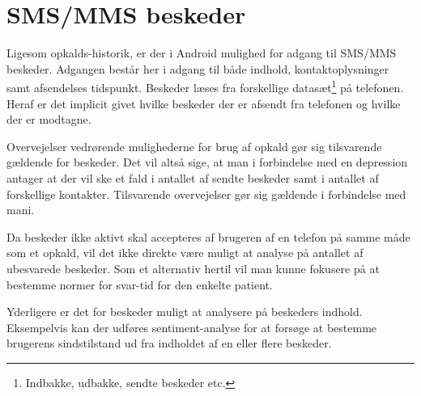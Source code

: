 \section{SMS/MMS beskeder}
Ligesom opkalds-historik, er der i Android mulighed for adgang til SMS/MMS beskeder.
Adgangen består her i adgang til både indhold, kontaktoplysninger samt afsendelses tidspunkt.
Beskeder læses fra forskellige datasæt\footnote{Indbakke, udbakke, sendte beskeder etc.} på telefonen.
Heraf er det implicit givet hvilke beskeder der er afsendt fra telefonen og hvilke der er modtagne.

Overvejelser vedrørende mulighederne for brug af opkald gør sig tilsvarende gældende for beskeder.
Det vil altså sige, at man i forbindelse med en depression antager at der vil ske et fald i antallet af sendte beskeder samt i antallet af forskellige kontakter.
Tilsvarende overvejelser gør sig gældende i forbindelse med mani.

Da beskeder ikke aktivt skal accepteres af brugeren af en telefon på samme måde som et opkald, vil det ikke direkte være muligt at analyse på antallet af ubesvarede beskeder.
Som et alternativ hertil vil man kunne fokusere på at bestemme normer for svar-tid for den enkelte patient.

Yderligere er det for beskeder muligt at analysere på beskeders indhold.
Eksempelvis kan der udføres sentiment-analyse for at forsøge at bestemme brugerens sindstilstand ud fra indholdet af en eller flere beskeder.